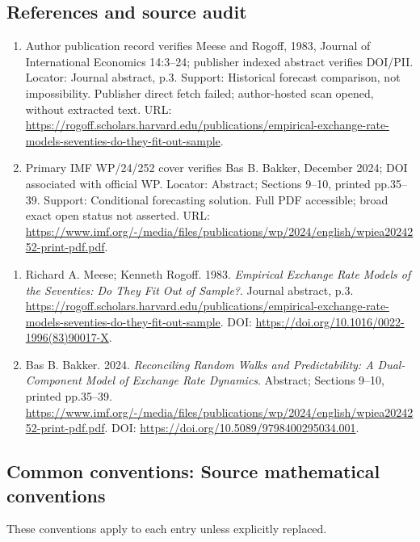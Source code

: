 \documentclass[11pt,a4paper]{article}
\begin{document}
\subsection*{References and source audit}
\begin{enumerate}
\item Author publication record verifies Meese and Rogoff, 1983, Journal of International Economics 14:3--24; publisher indexed abstract verifies DOI/PII. Locator: Journal abstract, p.3. Support: Historical forecast comparison, not impossibility. Publisher direct fetch failed; author-hosted scan opened, without extracted text. URL: \url{https://rogoff.scholars.harvard.edu/publications/empirical-exchange-rate-models-seventies-do-they-fit-out-sample}.
\item Primary IMF WP/24/252 cover verifies Bas B. Bakker, December 2024; DOI associated with official WP. Locator: Abstract; Sections 9--10, printed pp.35--39. Support: Conditional forecasting solution. Full PDF accessible; broad exact open status not asserted. URL: \url{https://www.imf.org/-/media/files/publications/wp/2024/english/wpiea2024252-print-pdf.pdf}.
\end{enumerate}
\begin{enumerate}\raggedright
\item\hypertarget{definitions:source:30007612:1}{} Richard A. Meese; Kenneth Rogoff. 1983. \emph{Empirical Exchange Rate Models of the Seventies: Do They Fit Out of Sample?}. Journal abstract, p.3.
\url{https://rogoff.scholars.harvard.edu/publications/empirical-exchange-rate-models-seventies-do-they-fit-out-sample}.
DOI: \url{https://doi.org/10.1016/0022-1996(83)90017-X}.
\item\hypertarget{definitions:source:30007612:2}{} Bas B. Bakker. 2024. \emph{Reconciling Random Walks and Predictability: A Dual-Component Model of Exchange Rate Dynamics}. Abstract; Sections 9--10, printed pp.35--39.
\url{https://www.imf.org/-/media/files/publications/wp/2024/english/wpiea2024252-print-pdf.pdf}.
DOI: \url{https://doi.org/10.5089/9798400295034.001}.
\end{enumerate}

\subsection*{Common conventions: Source mathematical conventions}

These conventions apply to each entry unless explicitly replaced.
\end{document}
